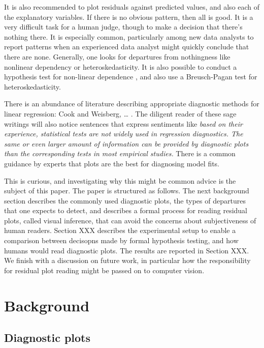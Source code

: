\documentclass[]{interact}
\theoremstyle{plain}%
\theoremstyle{definition}
\theoremstyle{remark}
\begin{document}
It is also recommended to plot residuals against predicted values, and
also each of the explanatory variables. If there is no obvious pattern,
then all is good. It is a very difficult task for a human judge, though
to make a decision that there's nothing there. It is especially common,
particularly among new data analysts to report patterns when an
experienced data analyst might quickly conclude that there are none.
Generally, one looks for departures from nothingness like nonlinear
dependency or heteroskedasticity. It is also possible to conduct a
hypothesis test for non-linear dependence \citep{RESET}, and also use a
Breusch-Pagan test \citep{REF} for heteroskedasticity.

There is an abundance of literature describing appropriate diagnostic
methods for linear regression: Cook and Weisberg, \ldots{} \citep{REF}.
The diligent reader of these sage writings will also notice sentences
that express sentiments like \emph{based on their experience,
statistical tests are not widely used in regression diagnostics. The
same or even larger amount of information can be provided by diagnostic
plots than the corresponding tests in most empirical studies.} There is
a common guidance by experts that plots are the best for diagnosing
model fits.

This is curious, and investigating why this might be common advice is
the subject of this paper. The paper is structured as follows. The next
background section describes the commonly used diagnostic plots, the
types of departures that one expects to detect, and describes a formal
process for reading residual plots, called visual inference, that can
avoid the concerns about subjectiveness of human readers. Section XXX
describes the experimental setup to enable a comparison between
decisopns made by formal hypothesis testing, and how humans would read
diagnostic plots. The results are reported in Section XXX. We finish
with a discussion on future work, in particular how the responsibility
for residual plot reading might be passed on to computer vision.

\hypertarget{background}{%
\section{Background}\label{background}}

\hypertarget{diagnostic-plots}{%
\subsection{Diagnostic plots}\label{diagnostic-plots}}
\end{document}
